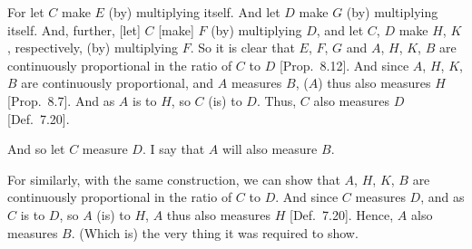 \begin{Parallel}{}{}
{For let $C$ make $E$ (by) multiplying itself. And let $D$ make $G$ (by)
multiplying itself. And, further, [let] $C$ [make] $F$ (by) multiplying
$D$,  and let  $C$, $D$ make  $H$, $K$, respectively, (by) multiplying
$F$. So it is clear that $E$, $F$, $G$ and $A$, $H$, $K$, $B$ are continuously proportional in the ratio of $C$ to $D$ [Prop.~8.12]. And since $A$, $H$, $K$, $B$ are
continuously proportional, and $A$ measures $B$, ($A$) thus also
measures $H$ [Prop.~8.7]. And as $A$ is to
$H$, so $C$ (is) to $D$. Thus, $C$ also measures $D$ [Def.~7.20].\\

\epsfysize=1.7in
\centerline{}

And so let $C$ measure $D$. I say that $A$ will also measure $B$.

For similarly, with the same construction, we can show that $A$, $H$, $K$, $B$ are continuously proportional in the ratio of $C$ to $D$. And since
$C$ measures $D$, and as $C$ is to $D$, so $A$ (is) to $H$, $A$ thus
also measures $H$ [Def.~7.20]. Hence, $A$ also measures $B$. (Which is) the
very thing it was required to show.}
\end{Parallel}

